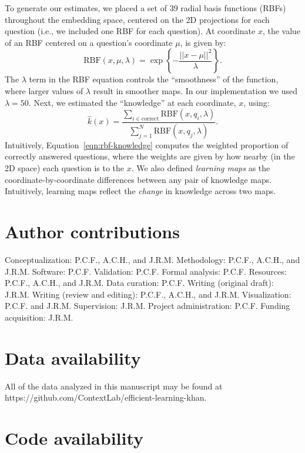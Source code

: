 \documentclass[10pt]{article}
\begin{document}
To generate our estimates, we placed a set of 39 radial basis functions (RBFs)
throughout the embedding space, centered on the 2D projections for each
question (i.e., we included one RBF for each question). At coordinate $x$, the
value of an RBF centered on a question's coordinate $\mu$, is given by:
\begin{equation}
    \mathrm{RBF}(x, \mu, \lambda) = \exp\left\{-\frac{||x - \mu||^2}{\lambda}\right\}.
    \label{eqn:rbf}
\end{equation}
The $\lambda$ term in the RBF equation controls the ``smoothness'' of the
function, where larger values of $\lambda$ result in smoother maps. In our
implementation we used $\lambda = 50$.  Next, we estimated the ``knowledge''
at each coordinate, $x$, using:
\begin{equation}
    \hat{k}(x) = \frac{\sum_{i \in \mathrm{correct}} \mathrm{RBF}(x, q_i, \lambda)}{\sum_{j = 1}^N \mathrm{RBF}(x, q_j, \lambda)}.
    \label{eqn:rbf-knowledge}
\end{equation}
Intuitively, Equation~\ref{eqn:rbf-knowledge} computes the weighted proportion of
correctly answered questions, where the weights are given by how nearby (in the 2D space)
each question is to the $x$.  We also defined \textit{learning maps} as the coordinate-by-coordinate
differences between any pair of knowledge maps.  Intuitively, learning maps reflect the \textit{change}
in knowledge across two maps.

\section*{Author contributions}

Conceptualization: P.C.F., A.C.H., and J.R.M. Methodology: P.C.F., A.C.H., and
J.R.M. Software: P.C.F. Validation: P.C.F. Formal analysis: P.C.F. Resources: P.C.F.,
A.C.H., and J.R.M. Data curation: P.C.F. Writing (original draft): J.R.M. Writing
(review and editing): P.C.F., A.C.H., and J.R.M. Visualization: P.C.F. and J.R.M.
Supervision: J.R.M. Project administration: P.C.F. Funding acquisition: J.R.M.


\section*{Data availability}

All of the data analyzed in this manuscript may be found at
https://github.com/Con\-text\-Lab/eff\-ic\-ient-learn\-ing-khan.

\section*{Code availability}
\end{document}
